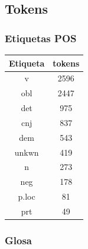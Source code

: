 \documentclass[letterpaper,12pt,oneside]{book}
\begin{document}
\subsection{Tokens}

\subsubsection{Etiquetas POS}

\begin{center}
	\begin{tabular}{c | c}
		\textbf{Etiqueta} & \textbf{tokens} \\ \hline \hline
		v & 2596 \\

		obl & 2447 \\

		det & 975 \\

		cnj & 837 \\

		dem & 543 \\

		unkwn & 419 \\

		n & 273 \\

		neg & 178 \\

		p.loc & 81 \\

		prt & 49 \\

	\end{tabular}

\end{center}

\subsubsection{Glosa}
\end{document}
